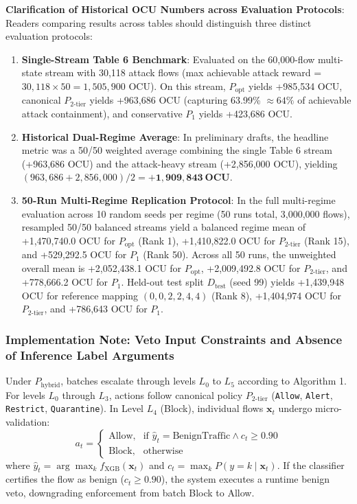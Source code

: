 \documentclass[journal,10pt,onecolumn]{IEEEtran}
\begin{document}
\textbf{Clarification of Historical OCU Numbers across Evaluation Protocols}:
Readers comparing results across tables should distinguish three distinct evaluation protocols:
\begin{enumerate}
    \item \textbf{Single-Stream Table 6 Benchmark}: Evaluated on the 60,000-flow multi-state stream with 30,118 attack flows (max achievable attack reward = $30,118 \times 50 = 1,505,900$ OCU). On this stream, $P_{\text{opt}}$ yields +985,534 OCU, canonical $P_{2\text{-tier}}$ yields +963,686 OCU (capturing 63.99\% $\approx 64\%$ of achievable attack containment), and conservative $P_1$ yields +423,686 OCU.
    \item \textbf{Historical Dual-Regime Average}: In preliminary drafts, the headline metric was a 50/50 weighted average combining the single Table 6 stream (+963,686 OCU) and the attack-heavy stream (+2,856,000 OCU), yielding $(963,686 + 2,856,000)/2 = \mathbf{+1,909,843 \ \text{OCU}}$.
    \item \textbf{50-Run Multi-Regime Replication Protocol}: In the full multi-regime evaluation across 10 random seeds per regime (50 runs total, 3,000,000 flows), resampled 50/50 balanced streams yield a balanced regime mean of +1,470,740.0 OCU for $P_{\text{opt}}$ (Rank 1), +1,410,822.0 OCU for $P_{2\text{-tier}}$ (Rank 15), and +529,292.5 OCU for $P_1$ (Rank 50). Across all 50 runs, the unweighted overall mean is +2,052,438.1 OCU for $P_{\text{opt}}$, +2,009,492.8 OCU for $P_{2\text{-tier}}$, and +778,666.2 OCU for $P_1$. Held-out test split $D_{\text{test}}$ (seed 99) yields +1,439,948 OCU for reference mapping $(0,0,2,2,4,4)$ (Rank 8), +1,404,974 OCU for $P_{2\text{-tier}}$, and +786,643 OCU for $P_1$.
\end{enumerate}

\subsubsection{Implementation Note: Veto Input Constraints and Absence of Inference Label Arguments}
Under $P_{\text{hybrid}}$, batches escalate through levels $L_0$ to $L_5$ according to Algorithm 1. For levels $L_0$ through $L_3$, actions follow canonical policy $P_{2\text{-tier}}$ (\texttt{Allow}, \texttt{Alert}, \texttt{Restrict}, \texttt{Quarantine}). In Level $L_4$ (Block), individual flows $\mathbf{x}_t$ undergo micro-validation:
$$a_t = \begin{cases} \text{Allow}, & \text{if } \hat{y}_t = \text{BenignTraffic} \land c_t \ge 0.90 \\ \text{Block}, & \text{otherwise} \end{cases}$$
where $\hat{y}_t = \arg\max_k f_{\text{XGB}}(\mathbf{x}_t)$ and $c_t = \max_k P(y=k \mid \mathbf{x}_t)$. If the classifier certifies the flow as benign ($c_t \ge 0.90$), the system executes a runtime benign veto, downgrading enforcement from batch Block to Allow.
\end{document}
